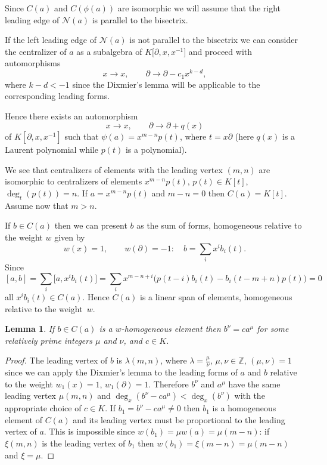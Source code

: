 \documentclass[pdftex]{sigma}
\numberwithin{equation}{section}
\newtheorem{Lemma}[Theorem]{Lemma}
\newcommand{\de}{\partial}
\newcommand{\Z}{\mathbb Z}
\newcommand{\la}{\lambda}
\begin{document}
Since $C(a)$ and $C(\phi(a))$ are isomorphic we will assume that the right leading edge of ${\mathcal N}(a)$ is parallel to the bisectrix.

If the left leading edge of ${\mathcal N}(a)$ is not parallel to the bisectrix we can consider the centralizer of $a$ as a subalgebra of $K\big[\de, x, x^{-1}\big]$ and proceed with automorphisms
\[
x \rightarrow x,\qquad
\de \rightarrow \de - c_1x^{k-d},
\]
where $k - d < -1$ since the Dixmier's lemma will be applicable to the corresponding leading forms.

Hence there exists an automorphism
\[
x \rightarrow x, \qquad
\de \rightarrow
\de + q(x)
\]
of $K[\de, x, x^{-1}]$
such that $\psi(a) = x^{m-n}p(t)$, where $t =
x\de$ (here $q(x)$ is a Laurent polynomial while $p(t)$ is a polynomial).

We see that centralizers of elements with the leading vertex $(m,n)$ are isomorphic to centra\-li\-zers of elements $x^{m-n}p(t)$, $p(t) \in K[t]$, $\deg_t(p(t)) = n$.
If $a = x^{m-n}p(t)$ and $m - n = 0$ then $C(a) = K[t]$. Assume now that $m > n$.

If $b \in C(a)$ then we can present $b$ as the sum of forms, homogeneous relative to the weight $w$ given by
\[
w(x) = 1,\qquad
w(\de) = -1\colon\quad b = \sum_i x^ib_i(t).
\]
Since
\[
[a,b] = \sum_i\big[a, x^ib_i(t)\big] =
\sum _i x^{m-n + i}\big(p(t-i)b_i(t) - b_i(t - m + n)p(t)\big) = 0
\]
all $x^ib_i(t) \in C(a)$. Hence $C(a)$ is a linear span of elements, homogeneous relative to the weight~$w$.

\begin{Lemma}\label{lemma2}
If $b \in C(a)$ is a $w$-homogeneous element then $b^\nu = ca^\mu$ for some relatively prime integers $\mu$ and $\nu$, and $c \in K$.
\end{Lemma}

\begin{proof}
The leading vertex of $b$ is $\la(m,n)$, where $\la = \frac{\mu}{\nu}$, $\mu, \nu \in \Z$, $(\mu,\nu) = 1$ since we can apply the Dixmier's lemma to the leading forms of $a$ and $b$ relative to the weight $w_1(x) = 1$, $w_1(\de) = 1$. Therefore $b^\nu$ and $a^\mu$ have the same leading vertex $\mu(m,n)$ and $\deg_x(b^\nu - ca^\mu) < \deg_x(b^\nu)$ with the appropriate choice of $c \in K$.
If $b_1 = b^\nu - ca^\mu \ne 0$ then $b_1$ is a homogeneous element of $C(a)$ and its leading vertex must be proportional to the leading vertex of $a$.
This is impossible since $w(b_1) = \mu w(a) = \mu(m-n)$: if $\xi(m,n)$ is the leading vertex of $b_1$ then $w(b_1) = \xi(m-n) = \mu(m-n)$ and $\xi = \mu$.
\end{proof}
\end{document}

